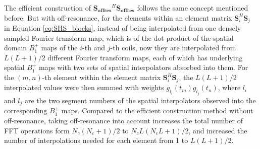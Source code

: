 The efficient construction of $\mathbf{S_{offres}}^{H}\mathbf{S_{offres}}$ follows the same concept mentioned before. 
But with off-resonance, for the elements within an element matrix $\mathbf{S}_i^{H}\mathbf{S}_j$ in Equation \ref{eq:SHS_blocks}, instead of being interpolated from one densely sampled Fourier transform map, which is of the dot product of the spatial domain $B_1^+$ maps of the $i$-th and $j$-th coils, now they are interpolated from $L(L+1)/2$ different Fourier transform maps, each of which has underlying spatial $B_1^+$ maps with two sets of spatial interpolators absorbed into them. For the $(m,n)$-th element within the element matrix $\mathbf{S}_i^{H}\mathbf{S}_j$, the $L(L+1)/2$ interpolated values were then summed with weights $g_{l_i}(t_m)g_{l_j}(t_n)$, where $l_i$ and $l_j$ are the two segment numbers of the spatial interpolators observed into the corresponding $B_1^+$ maps. 
Compared to the efficient construction method without off-resonance, taking off-resonance into account increases the total number of FFT operations form $N_c(N_c+1)/2$ to $N_cL(N_cL+1)/2$, and increased the number of interpolations needed for each element from 1 to $L(L+1)/2$.  


